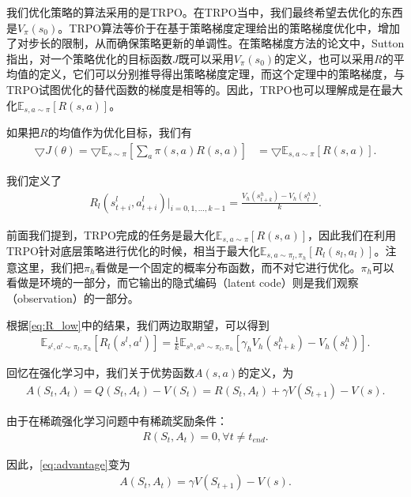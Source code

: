 \documentclass[degree=bachelor, tocarialchapter, pifootnote]{thuthesis}
\begin{document}
我们优化策略的算法采用的是TRPO\cite{TRPO}。在TRPO当中，我们最终希望去优化的东西是$V_{\pi}(s_0)$。TRPO算法等价于在基于策略梯度定理给出的策略梯度优化中，增加了对步长的限制，从而确保策略更新的单调性。在策略梯度方法的论文\cite{policy_gradient_theorem}中，Sutton指出，对一个策略优化的目标函数$J$既可以采用$V_{\pi}(s_0)$的定义，也可以采用$R$的平均值的定义，它们可以分别推导得出策略梯度定理，而这个定理中的策略梯度，与TRPO试图优化的替代函数的梯度是相等的。因此，TRPO也可以理解成是在最大化$\mathbb{E}_{s, a \sim \pi}[R(s, a)]$。

如果把$R$的均值作为优化目标，我们有
\begin{align}
  \bigtriangledown J(\theta) = \bigtriangledown \mathbb{E}_{s\sim\pi}[\sum_{a} \pi(s, a) R(s, a)]
  &= \bigtriangledown \mathbb{E}_{s, a\sim\pi}[R(s, a)].
  \label{eq:policy_gradient}
\end{align}

我们定义了
\begin{align}
  R_l(s_{t + i}^l, a_{t + i}^l)|_{i = 0,1,...,k-1} = \frac{V_h(s_{t + k}^h) - V_h(s_{t}^h)}{k}.
  \label{eq:R_low}
\end{align}

前面我们提到，TRPO完成的任务是最大化$\mathbb{E}_{s, a \sim \pi}[R(s, a)]$，因此我们在利用TRPO针对底层策略进行优化的时候，相当于最大化$\mathbb{E}_{s, a \sim \pi_l, \pi_h}[R_l(s_l, a_l)]$。注意这里，我们把$\pi_h$看做是一个固定的概率分布函数，而不对它进行优化。$\pi_h$可以看做是环境的一部分，而它输出的隐式编码（latent code）则是我们观察（observation）的一部分。

根据\eqref{eq:R_low}中的结果，我们两边取期望，可以得到
\begin{align}
  \mathbb{E}_{s^l, a^l \sim \pi_l, \pi_h}[R_l(s^l, a^l)] = \frac{1}{k} \mathbb{E}_{s^h, a^h \sim \pi_l, \pi_h}[\gamma_h V_h(s_{t + k}^h) - V_h(s_{t}^h)].
  \label{eq:R_expectation}
\end{align}

回忆在强化学习中，我们关于优势函数$A(s, a)$的定义，为
\begin{align}
  A(S_t, A_t) = Q(S_t, A_t) - V(S_t) = R(S_t, A_t) + \gamma V(S_{t + 1}) - V(s).
  \label{eq:advantage}
\end{align}

由于在稀疏强化学习问题中有稀疏奖励条件：
\begin{align}
  R(S_t, A_t) = 0, \forall t \neq t_{end}.
  \label{eq:sparse_reward_condition}
\end{align}

因此，\eqref{eq:advantage}变为
\begin{align}
  A(S_t, A_t) = \gamma V(S_{t + 1}) - V(s).
  \label{eq:sparse_advantage}
\end{align}
\end{document}
